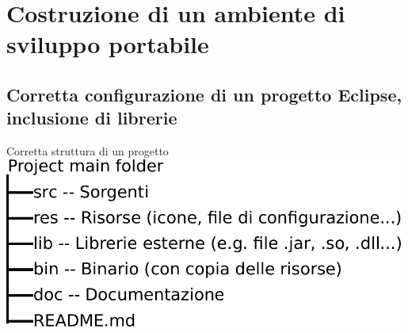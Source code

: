 \documentclass[presentation]{beamer}
\begin{document}
\section{Costruzione di un ambiente di sviluppo portabile}

\subsection{Corretta configurazione di un progetto Eclipse, inclusione di librerie}

\begin{frame}{Corretta struttura di un progetto}
	\centering
	\includegraphics[width=0.99\textwidth]{img/struct}
\end{frame}
\end{document}
